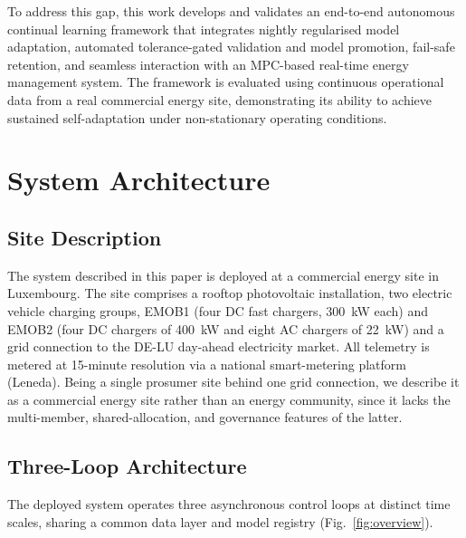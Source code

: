 \documentclass[journal]{IEEEtran}
\begin{document}
To address this gap, this work develops and validates an end-to-end
autonomous continual learning framework that integrates nightly
regularised model adaptation, automated tolerance-gated validation and
model promotion, fail-safe retention, and seamless interaction with an
MPC-based real-time energy management system. The framework is evaluated
using continuous operational data from a real commercial energy site,
demonstrating its ability to achieve sustained self-adaptation under
non-stationary operating conditions.


\section{System Architecture}
\label{sec:architecture}

\subsection{Site Description}
\label{sec:site}

The system described in this paper is deployed at a commercial energy
site in Luxembourg. The site comprises a rooftop photovoltaic
installation, two electric vehicle charging groups, EMOB1 (four DC
fast chargers, 300~kW each) and EMOB2 (four DC chargers of 400~kW and
eight AC chargers of 22~kW) and a grid connection to the DE-LU
day-ahead electricity market. All telemetry is metered at 15-minute
resolution via a national smart-metering platform (Leneda). Being a
single prosumer site behind one grid connection, we describe it as a
commercial energy site rather than an energy community, since it lacks
the multi-member, shared-allocation, and governance features of the
latter.

\subsection{Three-Loop Architecture}
\label{sec:three_loop}

The deployed system operates three asynchronous control loops at
distinct time scales, sharing a common data layer and model registry
(Fig.~\ref{fig:overview}).
\end{document}
